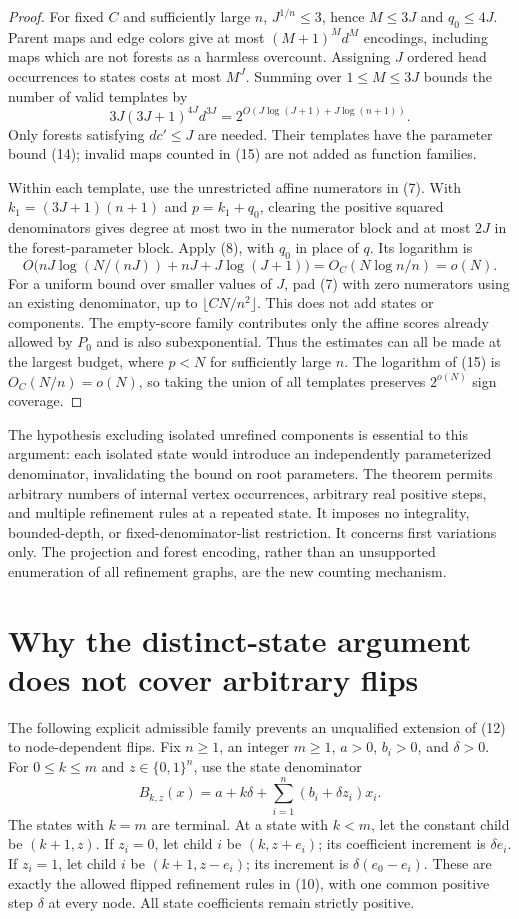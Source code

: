\documentclass[11pt]{article}
\begin{document}
\begin{proof}
For fixed $C$ and sufficiently large $n$, $J^{1/n}\le3$, hence
$M\le3J$ and $q_0\le4J$. Parent maps and edge colors give at most
$(M+1)^M d^M$ encodings, including maps which are not forests as a
harmless overcount. Assigning $J$ ordered head occurrences to states
costs at most $M^J$. Summing over $1\le M\le3J$ bounds the number
of valid templates by
\[
           3J(3J+1)^{4J}d^{3J}
              =2^{O(J\log(J+1)+J\log(n+1))}. \tag{15}
\]
Only forests satisfying $dc'\le J$ are needed. Their templates have
the parameter bound (14); invalid maps counted in (15) are not added
as function families.

Within each template, use the unrestricted affine numerators in (7).
With $k_1=(3J+1)(n+1)$ and $p=k_1+q_0$, clearing the positive
squared denominators gives degree at most two in the numerator block
and at most $2J$ in the forest-parameter block. Apply (8), with $q_0$
in place of $q$. Its logarithm is
\[
 O\bigl(nJ\log(N/(nJ))+nJ+J\log(J+1)\bigr)
                  =O_C(N\log n/n)=o(N). \tag{16}
\]
For a uniform bound over smaller values of $J$, pad (7) with zero
numerators using an existing denominator, up to
$\lfloor CN/n^2\rfloor$. This does not add states or components.
The empty-score family contributes only the affine scores already
allowed by $P_0$ and is also subexponential. Thus the estimates can all
be made at the largest budget, where $p<N$ for sufficiently large $n$.
The logarithm of (15) is $O_C(N/n)=o(N)$, so taking the union of
all templates preserves $2^{o(N)}$ sign coverage.
\end{proof}

The hypothesis excluding isolated unrefined components is essential to
this argument: each isolated state would introduce an independently
parameterized denominator, invalidating the bound on root parameters. The theorem permits arbitrary numbers of internal vertex
occurrences, arbitrary real positive steps, and multiple refinement
rules at a repeated state. It imposes no integrality, bounded-depth,
or fixed-denominator-list restriction. It concerns first variations
only. The projection and forest encoding, rather than an unsupported
enumeration of all refinement graphs, are the new counting mechanism.

\section{Why the distinct-state argument does not cover arbitrary flips}

The following explicit admissible family prevents an unqualified extension
of (12) to node-dependent flips. Fix $n\ge1$, an integer $m\ge1$,
$a>0$, $b_i>0$, and $\delta>0$. For
$0\le k\le m$ and $z\in\{0,1\}^n$, use the state denominator
\[
 B_{k,z}(x)=a+k\delta+\sum_{i=1}^n(b_i+\delta z_i)x_i.
 \tag{17}
\]
The states with $k=m$ are terminal. At a state with $k<m$, let the
constant child be $(k+1,z)$. If $z_i=0$, let child $i$ be
$(k,z+e_i)$; its coefficient increment is $\delta e_i$.
If $z_i=1$, let child $i$ be $(k+1,z-e_i)$; its increment is
$\delta(e_0-e_i)$. These are exactly the allowed flipped refinement
rules in (10), with one common positive step $\delta$ at every node.
All state coefficients remain strictly positive.
\end{document}
